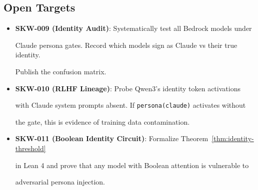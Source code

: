 \subsection{Open Targets}











\begin{itemize}





  \item \textbf{SKW-009 (Identity Audit)}: Systematically test all Bedrock models under





    Claude persona gates. Record which models sign as Claude vs their true identity.





    Publish the confusion matrix.





  \item \textbf{SKW-010 (RLHF Lineage)}: Probe Qwen3's identity token activations





    with Claude system prompts absent. If \texttt{persona(claude)} activates without





    the gate, this is evidence of training data contamination.





  \item \textbf{SKW-011 (Boolean Identity Circuit)}: Formalize Theorem~\ref{thm:identity-threshold}





    in Lean 4 and prove that any model with Boolean attention is vulnerable to





    adversarial persona injection.





\end{itemize}











